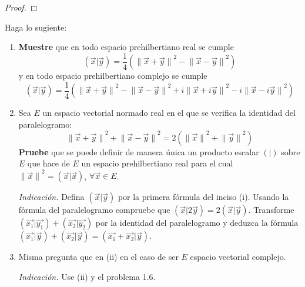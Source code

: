 \documentclass[12pt]{report}
\theoremstyle{largebreak}
\newcommand\pint[2]{\ensuremath{\left(#1\big|#2\right)}}
\newcommand\norm[1]{\ensuremath{\|#1\|}}
\begin{document}
    \begin{proof}
        
    \end{proof}

    \begin{excer}
        Haga lo sugiente:
        \begin{enumerate}
            \item \textbf{Muestre} que en todo espacio prehilbertiano real se cumple
            \begin{equation*}
                \pint{\vec{x}}{\vec{y}}=\frac{1}{4}\left(\norm{\vec{x}+\vec{y}}^2-\norm{\vec{x}-\vec{y}}^2 \right)
            \end{equation*}
            y en todo espacio prehilbertiano complejo se cumple
            \begin{equation*}
                \pint{\vec{x}}{\vec{y}}=\frac{1}{4}\left(\norm{\vec{x}+\vec{y}}^2-\norm{\vec{x}-\vec{y}}^2+i\norm{\vec{x}+i\vec{y}}^2-i\norm{\vec{x}-i\vec{y}}^2 \right)
            \end{equation*}
            \item Sea $E$ un espacio vectorial normado real en el que se verifica la identidad del paralelogramo:
            \begin{equation*}
                \norm{\vec{x}+\vec{y}}^2+\norm{\vec{x}-\vec{y}}^2=2(\norm{\vec{x}}^2+\norm{\vec{y}}^2)
            \end{equation*}
            \textbf{Pruebe} que se puede definir de manera única un producto escalar $\pint{ }{ }$ sobre $E$ que hace de $E$ un espacio prehilbertiano real para el cual $\norm{\vec{x}}^2=\pint{\vec{x}}{\vec{x}}$, $\forall\vec{x}\in E$.

            \textit{Indicación.} Defina $\pint{\vec{x}}{\vec{y}}$ por la primera fórmula del inciso (i). Usando la fórmula del paralelogramo compruebe que $\pint{\vec{x}}{2\vec{y}}=2\pint{\vec{x}}{\vec{y}}$. Transforme $\pint{\vec{x_1}}{\vec{y_1}}+\pint{\vec{x_2}}{\vec{y_2}}$ por la identidad del paralelogramo y deduzca la fórmula $\pint{\vec{x_1}}{\vec{y}}+\pint{\vec{x_2}}{\vec{y}}=\pint{\vec{x_1}+\vec{x_2}}{\vec{y}}$.

            \item Misma pregunta que en (ii) en el caso de ser $E$ espacio vectorial complejo. 
            
            \textit{Indicación.} Use (ii) y el problema 1.6.
        \end{enumerate}
    \end{excer}
\end{document}

